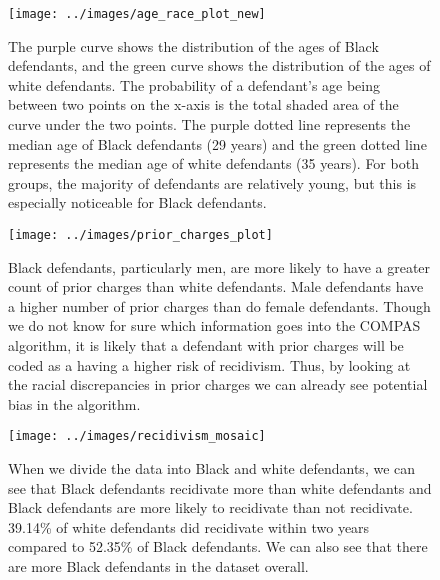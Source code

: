 \documentclass[,article,,moreauthors,pdftex]{mdpi}
\begin{document}
\begin{figure}

{\centering \texttt{[image: ../images/age\_race\_plot\_new]} 

}

\caption{The purple curve shows the distribution of the ages of Black defendants, and the green curve shows the distribution of the ages of white defendants. The probability of a defendant's age being between two points on the x-axis is the total shaded area of the curve under the two points. The purple dotted line represents the median age of Black defendants (29 years) and the green dotted line represents the median age of white defendants (35 years). For both groups, the majority of defendants are relatively young, but this is especially noticeable for Black defendants.}\label{fig:age plot}
\end{figure}

\begin{figure}

{\centering \texttt{[image: ../images/prior\_charges\_plot]} 

}

\caption{Black defendants, particularly men, are more likely to have a greater count of prior charges than white defendants. Male defendants have a higher number of prior charges than do female defendants. Though we do not know for sure which information goes into the COMPAS algorithm, it is likely that a defendant with prior charges will be coded as a having a higher risk of recidivism. Thus, by looking at the racial discrepancies in prior charges we can already see potential bias in the algorithm.}\label{fig:prior plot}
\end{figure}

\begin{figure}

{\centering \texttt{[image: ../images/recidivism\_mosaic]} 

}

\caption{When we divide the data into Black and white defendants, we can see that Black defendants recidivate more than white defendants and Black defendants are more likely to recidivate than not recidivate. 39.14\% of white defendants did recidivate within two years compared to 52.35\% of Black defendants. We can also see that there are more Black defendants in the dataset overall.}\label{fig:recidivism mosaic}
\end{figure}
\end{document}
